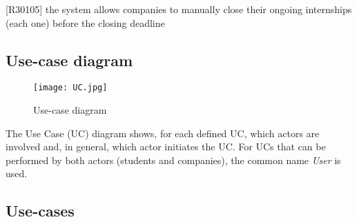 		[R30105] the system allows companies to manually close their ongoing internships (each one) before the closing deadline
		
		\subsection{Use-case diagram}
			
			\begin{figure}[H]
				\centering
				\texttt{[image: UC.jpg]}
				\caption{Use-case diagram}
			\end{figure}
			
			The Use Case (UC) diagram shows, for each defined UC, which actors are involved and, in general, which actor initiates the UC. For UCs that can be performed by both actors (students and companies), the common name \textit{User} is used.	
			
		\subsection{Use-cases}
			
